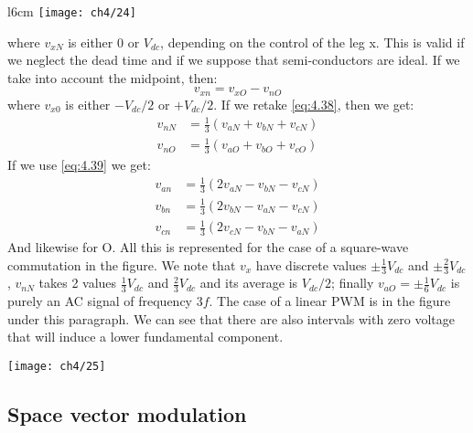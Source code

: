 	 \begin{wrapfigure}[12]{l}{6cm}
		\vspace{-5mm}
		\texttt{[image: ch4/24]}
		\end{wrapfigure}
		where $v_{xN}$ is either 0 or $V_{dc}$, depending on the control of the leg x. This is valid if we neglect the dead time and if we suppose that semi-conductors are ideal. If we take into account the midpoint, then:
	 \begin{equation}
	 	v_{xn} = v_{xO} - v_{nO}
	\end{equation}	  
	where $v_{x0}$ is either $-V_{dc}/2$ or $+V_{dc}/2$. If we retake  \eqref{eq:4.38}, then we get:
	\begin{equation}
	\begin{aligned}
	v_{nN} &= \frac{1}{3} (v_{aN} +v_{bN}+v_{cN})\\
	v_{nO} &= \frac{1}{3} (v_{aO} +v_{bO}+v_{cO})
	\end{aligned}
	\end{equation}
	If we use \eqref{eq:4.39} we get: 
	\begin{equation}
	\begin{aligned}
	v_{an} &= \frac{1}{3} (2v_{aN} -v_{bN}-v_{cN})\\
	v_{bn} &= \frac{1}{3} (2v_{bN} -v_{aN}-v_{cN})\\
	v_{cn} &= \frac{1}{3} (2v_{cN} -v_{bN}-v_{aN})
	\end{aligned}	
	\end{equation}
	And likewise for O. All this is represented for the case of a square-wave commutation in the figure. We note that $v_x$ have discrete values $\pm \frac{1}{3}V_{dc}$ and $\pm \frac{2}{3}V_{dc}$, $v_{nN}$ takes 2 values $ \frac{1}{3}V_{dc}$ and $\frac{2}{3}V_{dc}$ and its average is $V_{dc}/2$; finally $v_{aO}=\pm \frac{1}{6}V_{dc}$ is purely an AC signal of frequency $3f$. The case of a linear PWM is in the figure under this paragraph. We can see that there are also intervals with zero voltage that will induce a lower fundamental component.
	
	\begin{center}
		\texttt{[image: ch4/25]}
	\end{center}
	
	\subsection{Space vector modulation}
